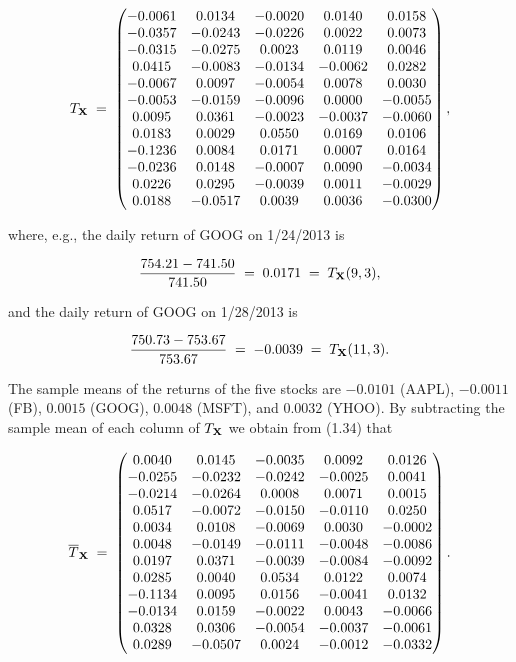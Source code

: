\[
T_{\mathbf{X}} \;=\;
\begin{pmatrix}
-0.0061 & 0.0134 & -0.0020 & 0.0140 & 0.0158 \\
-0.0357 & -0.0243 & -0.0226 & 0.0022 & 0.0073 \\
-0.0315 & -0.0275 & 0.0023 & 0.0119 & 0.0046 \\
0.0415 & -0.0083 & -0.0134 & -0.0062 & 0.0282 \\
-0.0067 & 0.0097 & -0.0054 & 0.0078 & 0.0030 \\
-0.0053 & -0.0159 & -0.0096 & 0.0000 & -0.0055 \\
0.0095 & 0.0361 & -0.0023 & -0.0037 & -0.0060 \\
0.0183 & 0.0029 & 0.0550 & 0.0169 & 0.0106 \\
-0.1236 & 0.0084 & 0.0171 & 0.0007 & 0.0164 \\
-0.0236 & 0.0148 & -0.0007 & 0.0090 & -0.0034 \\
0.0226 & 0.0295 & -0.0039 & 0.0011 & -0.0029 \\
0.0188 & -0.0517 & 0.0039 & 0.0036 & -0.0300
\end{pmatrix},
\]

where, e.g., the daily return of GOOG on 1/24/2013 is

\[
\frac{754.21-741.50}{741.50} \;=\; 0.0171 \;=\; T_{\mathbf{X}}(9,3),
\]

and the daily return of GOOG on 1/28/2013 is

\[
\frac{750.73-753.67}{753.67} \;=\; -0.0039 \;=\; T_{\mathbf{X}}(11,3).
\]

The sample means of the returns of the five stocks are $-0.0101$ (AAPL),
$-0.0011$ (FB), $0.0015$ (GOOG), $0.0048$ (MSFT), and $0.0032$ (YHOO). By
subtracting the sample mean of each column of $T_{\mathbf{X}}$ we obtain from
(1.34) that

\begin{equation}
\overline{T}_{\mathbf{X}} \;=\;
\begin{pmatrix}
0.0040 & 0.0145 & -0.0035 & 0.0092 & 0.0126 \\
-0.0255 & -0.0232 & -0.0242 & -0.0025 & 0.0041 \\
-0.0214 & -0.0264 & 0.0008 & 0.0071 & 0.0015 \\
0.0517 & -0.0072 & -0.0150 & -0.0110 & 0.0250 \\
0.0034 & 0.0108 & -0.0069 & 0.0030 & -0.0002 \\
0.0048 & -0.0149 & -0.0111 & -0.0048 & -0.0086 \\
0.0197 & 0.0371 & -0.0039 & -0.0084 & -0.0092 \\
0.0285 & 0.0040 & 0.0534 & 0.0122 & 0.0074 \\
-0.1134 & 0.0095 & 0.0156 & -0.0041 & 0.0132 \\
-0.0134 & 0.0159 & -0.0022 & 0.0043 & -0.0066 \\
0.0328 & 0.0306 & -0.0054 & -0.0037 & -0.0061 \\
0.0289 & -0.0507 & 0.0024 & -0.0012 & -0.0332
\end{pmatrix}.
\end{equation}

